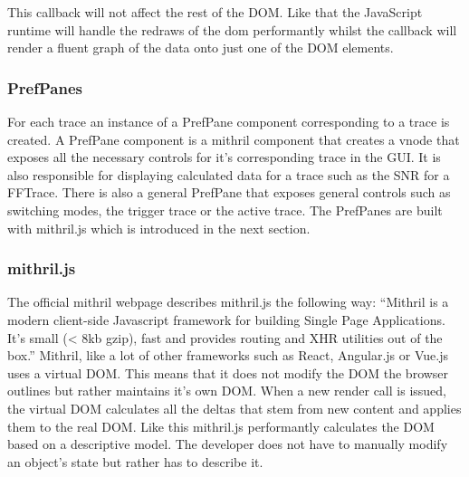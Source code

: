 
This callback  will not affect the  rest of the DOM. Like  that the JavaScript
runtime will  handle the redraws of  the dom performantly whilst  the callback
will render a fluent graph of the data onto just one of the DOM elements.

\subsubsection{PrefPanes}

For each trace an instance of a PrefPane component corresponding to a trace is
created. A PrefPane component is a mithril component that creates a vnode that
exposes all the necessary controls for it's corresponding trace in the GUI.
It is also responsible for displaying calculated  data for a trace such as the
SNR for a FFTrace.
There  is also  a  general  PrefPane that  exposes  general  controls such  as
switching modes, the trigger trace or the active trace.
The  PrefPanes are  built  with mithril.js  which is  introduced  in the  next
section.

\subsubsection{mithril.js}
\label{subsec:gui:mithril}

The official mithril webpage describes mithril.js the following way: ``Mithril
is  a  modern  client-side  Javascript  framework  for  building  Single  Page
Applications. It's  small (<  8kb gzip),  fast  and provides  routing and  XHR
utilities out  of the box.\cite{mithril:home}''  Mithril, like a lot  of other
frameworks such as React, Angular.js or  Vue.js uses a virtual DOM. This means
that it does not modify the DOM the browser outlines but rather maintains it's
own DOM. When a new render call is  issued, the virtual DOM calculates all the
deltas that stem from new content and  applies them to the real DOM. Like this
mithril.js performantly calculates  the DOM based on  a descriptive model. The
developer does not have to manually modify an object's state but rather has to
describe it.

